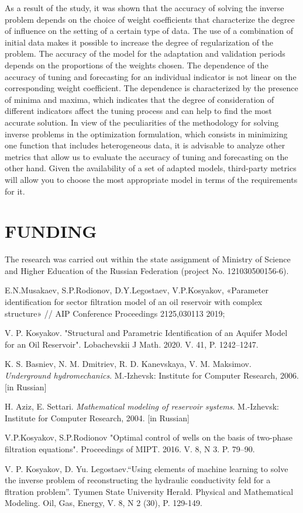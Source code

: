 \documentclass[
11pt,%
tightenlines,%
twoside,%
onecolumn,%
nofloats,%
nobibnotes,%
nofootinbib,%
superscriptaddress,%
noshowpacs,%
centertags]%
{revtex4}
\begin{document}
As a result of the study, it was shown that the accuracy of solving the inverse problem depends on the choice of weight coefficients that characterize the degree of influence on the setting of a certain type of data. The use of a combination of initial data makes it possible to increase the degree of regularization of the problem. The accuracy of the model for the adaptation and validation periods depends on the proportions of the weights chosen. The dependence of the accuracy of tuning and forecasting for an individual indicator is not linear on the corresponding weight coefficient. The dependence is characterized by the presence of minima and maxima, which indicates that the degree of consideration of different indicators affect the tuning process and can help to find the most accurate solution. In view of the peculiarities of the methodology for solving inverse problems in the optimization formulation, which consists in minimizing one function that includes heterogeneous data, it is advisable to analyze other metrics that allow us to evaluate the accuracy of tuning and forecasting on the other hand. Given the availability of a set of adapted models, third-party metrics will allow you to choose the most appropriate model in terms of the requirements for it.


\section{FUNDING}
The research was carried out within the state assignment of Ministry of Science and Higher Education of the Russian Federation (project No. 121030500156-6).

%
%
\begin{thebibliography}{99}
	
 E.N.Musakaev, S.P.Rodionov, D.Y.Legostaev, V.P.Kosyakov,  «Parameter identification for sector filtration model of an oil reservoir with complex structure» // AIP Conference Proceedings 2125,030113 2019;

 V. P. Kosyakov. "Structural and Parametric Identification of an Aquifer Model for an Oil Reservoir". Lobachevskii J Math. 2020. V. 41, P. 1242–1247.

 K. S. Basniev, N. M. Dmitriev, R. D. Kanevskaya, V. M. Maksimov. \textit{Underground hydromechanics}. M.-Izhevsk: Institute for Computer Research, 2006. [in Russian]

 H. Aziz, E. Settari. \textit{Mathematical modeling of reservoir systems}.  M.-Izhevsk: Institute for Computer Research, 2004. [in Russian]

 V.P.Kosyakov, S.P.Rodionov "Optimal control of wells on the basis of two-phase filtration equations". Proceedings of MIPT. 2016. V. 8, N 3. P. 79–90.

 V. P. Kosyakov,  D. Yu. Legostaev.“Using elements of machine learning to
solve the inverse problem of reconstructing the hydraulic conductivity feld for a fltration
problem”. Tyumen State University Herald. Physical and Mathematical Modeling. Oil, Gas,
Energy, V. 8, N 2 (30), P. 129-149.


\end{thebibliography}
\end{document}
